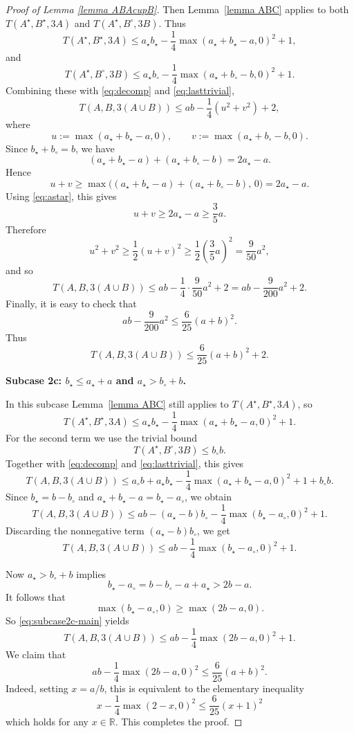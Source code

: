 \documentclass[10pt,a4paper]{amsart}
\begin{document}
\begin{proof}[Proof of Lemma \ref{lemma ABAcupB}]
Then Lemma~\ref{lemma ABC} applies to both $T(A^{\star},B^{\star},3A)$ and $T(A^{\star},B^{\circ},3B)$. Thus
\[
T(A^{\star},B^{\star},3A)
\le
a_{\star}b_{\star}
-\frac14\max(a_{\star}+b_{\star}-a,0)^2
+1,
\]
and
\[
T(A^{\star},B^{\circ},3B)
\le
a_{\star}b_{\circ}
-\frac14\max(a_{\star}+b_{\circ}-b,0)^2
+1.
\]
Combining these with \eqref{eq:decomp} and \eqref{eq:lasttrivial},
\[
T(A,B,3(A\cup B))
\le
ab
-\frac14(u^2+v^2)
+2,
\]
where
\[
u:=\max(a_{\star}+b_{\star}-a,0),\qquad
v:=\max(a_{\star}+b_{\circ}-b,0).
\]
Since $b_{\star}+b_{\circ}=b$, we have
\[
(a_{\star}+b_{\star}-a)+(a_{\star}+b_{\circ}-b)=2a_{\star}-a.
\]
Hence
\[
u+v
\ge
\max\bigl((a_{\star}+b_{\star}-a)+(a_{\star}+b_{\circ}-b),\,0\bigr)
=
2a_{\star}-a.
\]
Using \eqref{eq:astar}, this gives
\[
u+v\ge 2a_{\star}-a\ge \frac35a.
\]
Therefore
\[
u^2+v^2\ge \frac12(u+v)^2\ge \frac12\left(\frac35a\right)^2=\frac{9}{50}a^2,
\]
and so
\[
T(A,B,3(A\cup B))
\le
ab-\frac14\cdot \frac{9}{50}a^2+2
=
ab-\frac{9}{200}a^2+2.
\]
Finally, it is easy to check that 
\[
ab-\frac{9}{200}a^2\le \frac6{25}(a+b)^2
.\]
Thus
\[
T(A,B,3(A\cup B))\le \frac6{25}(a+b)^2+2.
\]

\medskip
\noindent\textbf{Subcase 2c: $b_{\star}\le a_{\star}+a$ and $a_{\star}>b_{\circ}+b$.}

In this subcase Lemma~\ref{lemma ABC} still applies to $T(A^{\star},B^{\star},3A)$, so
\[
T(A^{\star},B^{\star},3A)
\le
a_{\star}b_{\star}
-\frac14\max(a_{\star}+b_{\star}-a,0)^2
+1.
\]
For the second term we use the trivial bound
\[
T(A^{\star},B^{\circ},3B)\le b_{\circ}b.
\]
Together with \eqref{eq:decomp} and \eqref{eq:lasttrivial}, this gives
\[
T(A,B,3(A\cup B))
\le
a_{\circ}b
+
a_{\star}b_{\star}
-\frac14\max(a_{\star}+b_{\star}-a,0)^2
+1
+
b_{\circ}b.
\]
Since $b_{\star}=b-b_{\circ}$ and $a_{\star} + b_{\star} - a = b_{\star} - a_{\circ}$, we obtain
\[
T(A,B,3(A\cup B))
\le
ab
-
(a_{\star}-b)b_{\circ}
-
\frac14\max(b_{\star}-a_{\circ},0)^2
+1.
\]
Discarding the nonnegative term $(a_{\star}-b)b_{\circ}$, we get
\begin{equation}
\label{eq:subcase2c-main}
T(A,B,3(A\cup B))
\le
ab
-
\frac14\max(b_{\star}-a_{\circ},0)^2
+1.
\end{equation}

Now $a_{\star}>b_{\circ}+b$ implies
\[
b_{\star}-a_{\circ}
=
b-b_{\circ}-a+a_{\star}
>
2b-a.
\]
It follows that
\[
\max(b_{\star}-a_{\circ},0)\ge \max(2b-a,0).
\]
So \eqref{eq:subcase2c-main} yields
\[
T(A,B,3(A\cup B))
\le
ab-\frac14\max(2b-a,0)^2+1.
\]
We claim that
\[
ab-\frac14\max(2b-a,0)^2\le \frac6{25}(a+b)^2.
\]
Indeed, setting $x = a / b$, this is equivalent to the elementary inequality
$$x - \frac{1}{4}\max\left(2 - x, 0\right)^{2} \leq \frac{6}{25}\left(x + 1\right)^{2}$$
which holds for any $x \in \mathbb{R}$. This completes the proof.
\end{proof}
\end{document}
